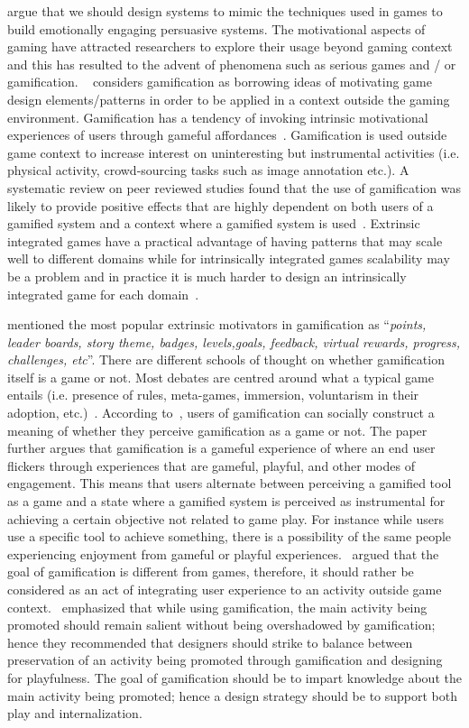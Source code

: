 \cite{nakajima2013designing} argue that we should design systems to mimic the techniques used in games to build emotionally engaging persuasive systems. The motivational aspects of gaming have attracted researchers to explore their usage beyond gaming context and this has resulted to the advent of phenomena such as serious games and / or gamification. ~\cite{deterding2011game} considers gamification as borrowing ideas of motivating game design elements/patterns in order to be applied in a context outside the gaming environment. Gamification has a tendency of invoking intrinsic motivational experiences of users through gameful affordances~\citep{hamari2014persuasive}. Gamification is used outside game context to increase interest on uninteresting but instrumental activities (i.e. physical activity, crowd-sourcing tasks such as image annotation etc.). A systematic review on peer reviewed studies found that the use of gamification was likely to provide positive effects that are highly dependent on both users of a gamified system and a context where a gamified system is used~\citep{hamari2014does}. Extrinsic integrated games have a practical advantage of having patterns that may scale well to different domains while for intrinsically integrated games scalability may be a problem and in practice it is much harder to design an intrinsically integrated game for each domain~\citep{preist2015use}.

\cite{hamari2014does} mentioned  the most popular extrinsic motivators in gamification as ``\emph{points, leader boards, story theme, badges, levels,goals, feedback, virtual rewards, progress, challenges, etc}''. There are different schools of thought on whether gamification itself is a game or not. Most debates are centred around what a typical game entails (i.e. presence of rules, meta-games, immersion, voluntarism in their adoption, etc.)~\citep{seaborn2015:gamification}. According to~\cite{deterding2011game}, users of gamification can socially construct a meaning of whether they perceive gamification as a game or not. The paper further argues that gamification is a gameful experience of where an end user flickers through experiences that are gameful, playful, and other modes of engagement. This means that users alternate between perceiving a gamified tool as a game and a state where a gamified system is perceived as instrumental for achieving a certain objective not related to game play. For instance while users use a specific tool to achieve something, there is a possibility of the same people experiencing enjoyment from gameful or playful experiences.~\cite{seaborn2015:gamification} argued that the goal of gamification is different from games, therefore, it should rather be considered as an act of integrating user experience to an activity outside game context.~\cite{knaving2013designing} emphasized that while using gamification, the main activity being promoted should remain salient without being overshadowed by gamification; hence they recommended that designers should strike to balance between preservation of an activity being promoted through gamification and designing for playfulness. The goal of gamification should be to impart knowledge about the main activity being promoted; hence a design strategy should be to support both play and internalization.

